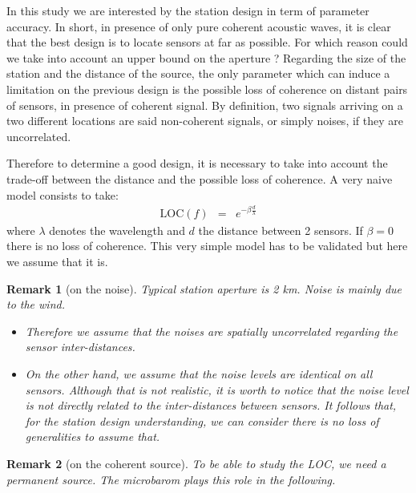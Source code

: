 \documentclass[a4paper, 12pt]{report}
\newtheorem{remark}{Remark}
\def\loc{\mathrm{LOC}}
\begin{document}
 \sloppy


In this study we are interested by the station design in term of parameter accuracy. In short, in presence of only pure coherent acoustic waves, it is clear that the best design is to locate sensors at far as possible. For which reason could we take into account an upper bound on the aperture ? Regarding the size of the station and the distance of the source, the only parameter which can induce a limitation on the previous design is the possible loss of coherence on distant pairs of sensors, in presence of coherent signal. By definition, two signals arriving on a two different locations are said non-coherent signals, or simply noises, if they are uncorrelated.

Therefore to determine a good design, it is necessary to take into account the trade-off between the distance and the possible loss of coherence. A very naive model consists to take:
\begin{eqnarray*}
 \loc(f) &=& e^{-\beta \frac{d}{\lambda}}%
\end{eqnarray*}
where $\lambda$ denotes the wavelength and $d$ the distance between 2 sensors. If $\beta=0$ there is no loss of coherence. This very simple model has to be validated but here we assume that it is.

\begin{remark}[on the noise]
Typical station aperture  is 2 km. Noise is mainly due to the wind.
\begin{itemize}
\item
Therefore we assume that the noises are spatially uncorrelated regarding the sensor inter-distances.
\item
On the other hand, we assume that the noise levels are identical on all sensors. Although that is not realistic, it is worth to notice that the noise level is not directly related to the inter-distances between sensors. It follows that, for the station design understanding, we can consider there is no loss of generalities to assume that.
\end{itemize}
\end{remark}

\begin{remark}[on the coherent source]
To be able to study the LOC, we need a permanent source. The microbarom plays this role in the following.
\end{remark}
\end{document}
